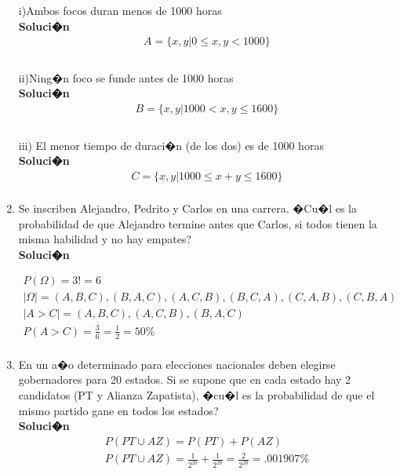 \documentclass{article}
\begin{document}
\begin{enumerate}
	 i)Ambos focos duran menos de 1000 horas     \\
	 \textbf{Soluci�n}\\
    \begin{gather*}
        A = \lbrace x,y | 0\leq x,y <1000\rbrace \\
    \end{gather*}\\
    ii)Ning�n foco se funde antes de 1000 horas 
    \\\textbf{Soluci�n}\\
    \begin{gather*}
        B = \lbrace x,y | 1000 < x,y \leq 1600\rbrace \\
    \end{gather*}\\
    iii) El menor tiempo de duraci�n (de los dos) es de 1000 horas
    \\\textbf{Soluci�n}\\
    \begin{gather*}
        C = \lbrace x,y | 1000 \leq x+y \leq 1600\rbrace \\
    \end{gather*}
    
	\item Se inscriben Alejandro, Pedrito y Carlos en una carrera. �Cu�l es la probabilidad de que Alejandro termine antes que Carlos, si todos tienen la misma habilidad y no hay empates? 
    \\\textbf{Soluci�n}
    
    \begin{gather*}
        P(\Omega) = 3! = 6\\
        |\Omega| = {(A,B,C), (B,A,C), (A,C,B), (B,C,A), (C,A,B), (C,B,A)}\\
        |A>C| = {(A,B,C), (A,C,B), (B,A,C)}\\
        P(A>C) = \frac{3}{6} =  \frac{1}{2} = 50\% \\        
    \end{gather*}
    
	\item En un a�o determinado para elecciones nacionales deben elegirse gobernadores para 20 estados. Si se supone que en cada estado hay 2 candidatos (PT y Alianza Zapatista), �cu�l es la probabilidad de que el mismo partido gane en todos los estados?
    \\\textbf{Soluci�n}\\
    \begin{gather*}
    	P(PT \cup AZ)= P(PT) + P(AZ)\\
    	P(PT \cup AZ)= \frac{1}{2^{20}} + \frac{1}{2^{20}} = \frac{2}{2^{20}} = .001907\%\\
    \end{gather*}
    

\end{enumerate}
\end{document}
